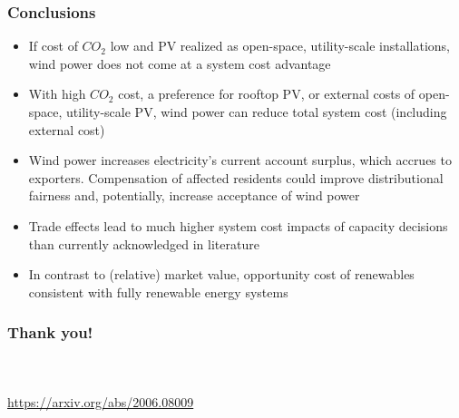 \documentclass[aspectratio=1610, xcolor=dvipsnames]{beamer}
\begin{document}
    \begin{frame}
        \frametitle{Conclusions}
        \begin{itemize}
            \item If cost of $CO_2$ low and PV realized as open-space, utility-scale installations,
            wind power does not come at a system cost advantage
            \item With high $CO_2$ cost, a preference for rooftop PV, or external costs of
            open-space, utility-scale PV, wind power can reduce total system cost (including external cost)
            \item Wind power increases electricity's current account surplus, which accrues to exporters.
            Compensation of affected residents could improve distributional fairness and, potentially, increase
            acceptance of wind power \\
            \medskip
            \item Trade effects lead to much higher system cost impacts of capacity decisions than currently acknowledged in literature
            \item In contrast to (relative) market value, opportunity cost of renewables consistent with fully renewable energy systems
        \end{itemize}
    \end{frame}

    \begin{frame}
        \frametitle{Thank you!}
        \begin{center}
            \\%
            \vspace{0.6cm}
            \\
            \vspace{0.6 cm}
            \href{https://arxiv.org/abs/2006.08009}{https://arxiv.org/abs/2006.08009}
        \end{center}
    \end{frame}
\end{document}
